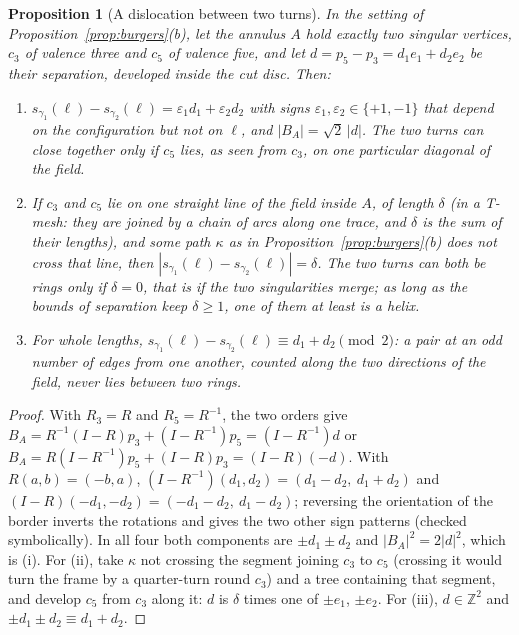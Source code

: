 \documentclass[11pt,a4paper]{article}
\newtheorem{proposition}{Proposition}
\newcommand{\Z}{\mathbb{Z}}
\newcommand{\shift}{s}
\begin{document}
\begin{proposition}[A dislocation between two turns]\label{prop:dislocation}
In the setting of Proposition~\ref{prop:burgers}(b), let the annulus $A$ hold
exactly two singular vertices, $c_3$ of valence three and $c_5$ of valence
five, and let $d = p_5 - p_3 = d_1 e_1 + d_2 e_2$ be their separation,
developed inside the cut disc. Then:
\begin{enumerate}
\item[(i)] $\shift_{\gamma_1}(\ell) - \shift_{\gamma_2}(\ell) = \varepsilon_1
  d_1 + \varepsilon_2 d_2$ with signs $\varepsilon_1, \varepsilon_2 \in \{+1,
  -1\}$ that depend on the configuration but not on $\ell$, and $|B_A| =
  \sqrt2\,|d|$. The two turns can close together only if $c_5$ lies, as seen
  from $c_3$, on one particular diagonal of the field.
\item[(ii)] If $c_3$ and $c_5$ lie on one straight line of the field inside
  $A$, of length $\delta$ (in a T-mesh: they are joined by a chain of arcs
  along one trace, and $\delta$ is the sum of their lengths), and some path
  $\kappa$ as in Proposition~\ref{prop:burgers}(b) does not cross that line,
  then
  $|\shift_{\gamma_1}(\ell) - \shift_{\gamma_2}(\ell)| = \delta$. The two turns
  can both be rings only if $\delta = 0$, that is if the two singularities
  merge; as long as the bounds of separation keep $\delta \ge 1$, one of them at
  least is a helix.
\item[(iii)] For whole lengths, $\shift_{\gamma_1}(\ell) -
  \shift_{\gamma_2}(\ell) \equiv d_1 + d_2 \pmod 2$: a pair at an odd number of
  edges from one another, counted along the two directions of the field, never
  lies between two rings.
\end{enumerate}
\end{proposition}

\begin{proof}
With $R_3 = R$ and $R_5 = R^{-1}$, the two orders give $B_A = R^{-1}(I -
R)p_3 + (I - R^{-1})p_5 = (I - R^{-1})d$ or $B_A = R(I - R^{-1})p_5 + (I -
R)p_3 = (I - R)(-d)$. With $R(a, b) = (-b, a)$, $(I - R^{-1})(d_1, d_2) = (d_1 -
d_2,\ d_1 + d_2)$ and $(I - R)(-d_1, -d_2) = (-d_1 - d_2,\ d_1 - d_2)$;
reversing the orientation of the border inverts the rotations and gives the
two other sign patterns (checked symbolically). In all four both components
are $\pm d_1 \pm d_2$ and $|B_A|^2 = 2|d|^2$, which is (i). For (ii), take
$\kappa$ not crossing the segment joining $c_3$ to $c_5$ (crossing it would
turn the frame by a quarter-turn round $c_3$) and a tree containing that
segment, and develop $c_5$ from
$c_3$ along it: $d$ is $\delta$ times one of $\pm e_1$, $\pm e_2$. For (iii), $d
\in \Z^2$ and $\pm d_1 \pm d_2 \equiv d_1 + d_2$.
\end{proof}
\end{document}
